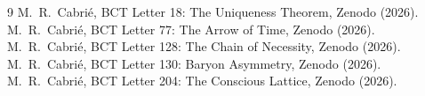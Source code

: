 \documentclass[aps,prl,twocolumn,superscriptaddress]{revtex4-2}
\begin{document}
\begin{thebibliography}{9}
 M.~R.~Cabri\'e, BCT Letter 18: The Uniqueness Theorem, Zenodo (2026).
 M.~R.~Cabri\'e, BCT Letter 77: The Arrow of Time, Zenodo (2026).
 M.~R.~Cabri\'e, BCT Letter 128: The Chain of Necessity, Zenodo (2026).
 M.~R.~Cabri\'e, BCT Letter 130: Baryon Asymmetry, Zenodo (2026).
 M.~R.~Cabri\'e, BCT Letter 204: The Conscious Lattice, Zenodo (2026).
\end{thebibliography}
\end{document}
